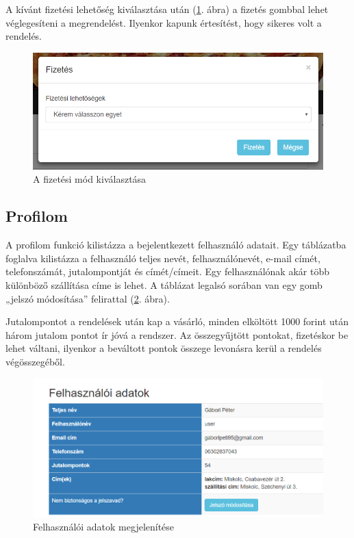 A kívánt fizetési lehetőség kiválasztása után (\ref{fig:payment}. ábra) a fizetés gombbal lehet véglegesíteni a megrendelést. Ilyenkor kapunk értesítést, hogy sikeres volt a rendelés.

\begin{figure}
\centering
\includegraphics[scale=0.8]{kepek/payment.png}
\caption{A fizetési mód kiválasztása}
\label{fig:payment}
\end{figure}

\subsection{Profilom}

A profilom funkció kilistázza a bejelentkezett felhasználó adatait. Egy táblázatba foglalva kilistázza a felhasználó teljes nevét, felhasználónevét, e-mail címét, telefonszámát, jutalompontját és címét/címeit. Egy felhasználónak akár több különböző szállítása címe is lehet. A táblázat legalsó sorában van egy gomb „jelszó módosítása” felirattal (\ref{fig:profile}. ábra).

Jutalompontot a rendelések után kap a vásárló, minden elköltött 1000 forint után három jutalom pontot ír jóvá a rendszer. Az összegyűjtött pontokat, fizetéskor be lehet váltani, ilyenkor a beváltott pontok összege levonásra kerül a rendelés végösszegéből.

\begin{figure}
\centering
\includegraphics[scale=0.6]{kepek/profile.png}
\caption{Felhasználói adatok megjelenítése}
\label{fig:profile}
\end{figure}

